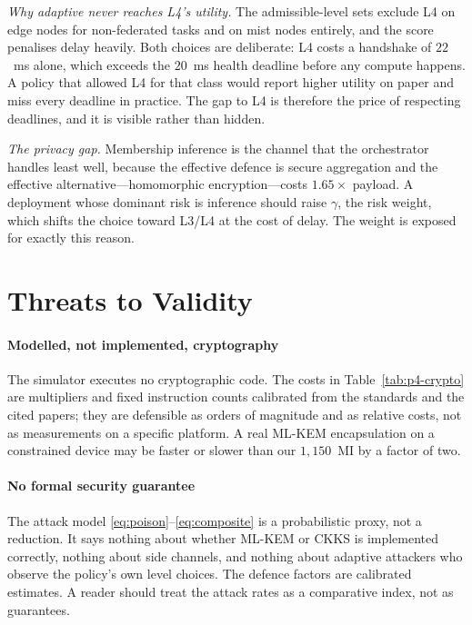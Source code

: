\documentclass[journal,10pt]{IEEEtran}
\begin{document}
\emph{Why adaptive never reaches L4's utility.} The admissible-level sets
exclude L4 on edge nodes for non-federated tasks and on mist nodes entirely,
and the score penalises delay heavily. Both choices are deliberate: L4 costs a
handshake of $22$~ms alone, which exceeds the $20$~ms health deadline before any
compute happens. A policy that allowed L4 for that class would report higher
utility on paper and miss every deadline in practice. The gap to L4 is
therefore the price of respecting deadlines, and it is visible rather than
hidden.

\emph{The privacy gap.} Membership inference is the channel that the
orchestrator handles least well, because the effective defence is secure
aggregation and the effective alternative---homomorphic encryption---costs
$1.65\times$ payload. A deployment whose dominant risk is inference should
raise $\gamma$, the risk weight, which shifts the choice toward L3/L4 at the
cost of delay. The weight is exposed for exactly this reason.

\section{Threats to Validity}
\label{sec:threats}

\paragraph{Modelled, not implemented, cryptography}
The simulator executes no cryptographic code. The costs in
Table~\ref{tab:p4-crypto} are multipliers and fixed instruction counts
calibrated from the standards and the cited papers; they are defensible as
orders of magnitude and as relative costs, not as measurements on a specific
platform. A real ML-KEM encapsulation on a constrained device may be faster or
slower than our $1{,}150$~MI by a factor of two.

\paragraph{No formal security guarantee}
The attack model \eqref{eq:poison}--\eqref{eq:composite} is a probabilistic
proxy, not a reduction. It says nothing about whether ML-KEM or CKKS is
implemented correctly, nothing about side channels, and nothing about adaptive
attackers who observe the policy's own level choices. The defence factors are
calibrated estimates. A reader should treat the attack rates as a comparative
index, not as guarantees.
\end{document}

